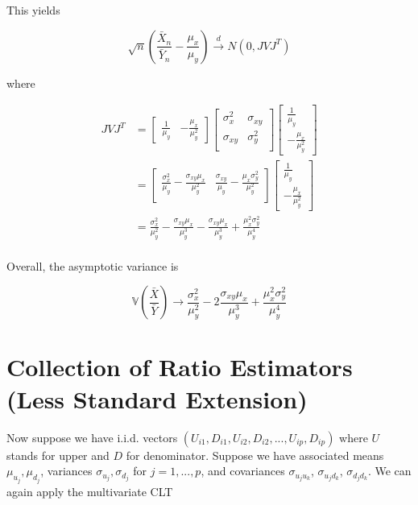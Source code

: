 \documentclass{article}
\newcommand{\Var}{\mathbb{V}}
\theoremstyle{definition}
\begin{document}
This yields

\begin{equation*}
\sqrt{n}\left(\frac{\bar{X}_n}{\bar{Y}_n} - \frac{\mu_x}{\mu_y}\right) \xrightarrow{d} N(0, JVJ^T)
\end{equation*}

where


\begin{align*}
    JVJ^T &= \begin{bmatrix}
\frac{1}{\mu_y} &  -\frac{\mu_x}{\mu_y^2}
\end{bmatrix} 
\begin{bmatrix}
    \sigma_x^2   &  \sigma_{xy}\\
    \sigma_{xy} & \sigma_y^2  \\
\end{bmatrix}
\begin{bmatrix}
\frac{1}{\mu_y} \\ -\frac{\mu_x}{\mu_y^2}
\end{bmatrix} \\ 
&= %
\begin{bmatrix}
  \frac{\sigma_x^2}{\mu_y} - \frac{\sigma_{xy}\mu_x}{\mu_y^2}  & \frac{\sigma_{xy}}{\mu_y} - \frac{\mu_x\sigma_{y}^2}{\mu_y^2} \\
\end{bmatrix}
\begin{bmatrix}
\frac{1}{\mu_y} \\ -\frac{\mu_x}{\mu_y^2}
\end{bmatrix} \\ 
&=
  \frac{\sigma_x^2}{\mu_y^2} - \frac{\sigma_{xy}\mu_x}{\mu_y^3}  - \frac{\sigma_{xy}\mu_x}{\mu_y^3} + \frac{\mu_x^2\sigma_{y}^2}{\mu_y^4} \\
\end{align*}

Overall, the asymptotic variance is

\begin{equation}\label{eq-ratiovar}
  \Var\left(\frac{\bar{X}}{\bar{Y}}\right)\rightarrow  \frac{\sigma_x^2}{\mu_y^2} - 2\frac{\sigma_{xy}\mu_x}{\mu_y^3}  + \frac{\mu_x^2\sigma_{y}^2}{\mu_y^4}
\end{equation}


\newpage 
\section{Collection of Ratio Estimators (Less Standard Extension)}

Now suppose we have i.i.d. vectors $(U_{i1},D_{i1},U_{i2},D_{i2},...,U_{ip},D_{ip})$ where $U$ stands for upper and $D$ for denominator. Suppose we have associated means $\mu_{u_j},\mu_{d_j}$, variances $\sigma_{u_j},\sigma_{d_j}$ for $j=1,...,p$, and covariances $\sigma_{u_ju_k}$, $\sigma_{u_jd_k}$, $\sigma_{d_jd_k}$. We can again apply the multivariate CLT
\end{document}
